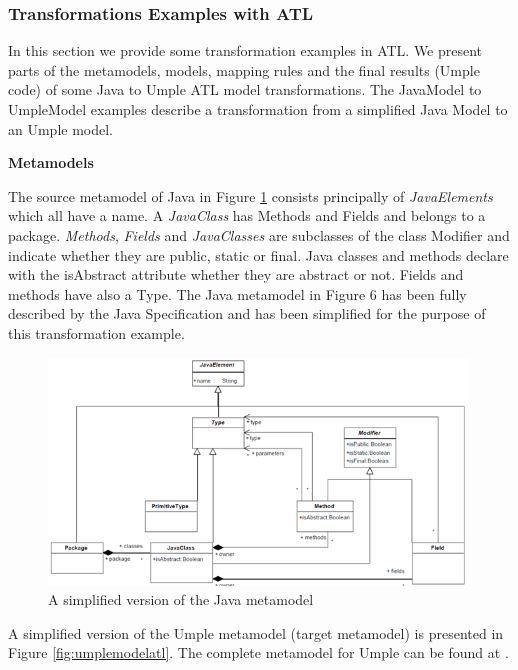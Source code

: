 \subsubsection{Transformations Examples with ATL}
\label{subsubsec:exampleATL}

In this section we provide some transformation examples in ATL. We present parts of the metamodels, models, mapping rules and the final results (Umple code) of some Java to Umple ATL model transformations.
The JavaModel to UmpleModel examples describe a transformation from a simplified Java Model to an Umple model. 

\textbf{Metamodels} 

The source metamodel of Java in Figure \ref{fig:javamodelatl} consists principally of \textit{JavaElements} which all have a name. A \textit{JavaClass} has Methods and Fields and belongs to a package. \textit{Methods}, \textit{Fields} and \textit{JavaClasses} are subclasses of the class Modifier and indicate whether they are public, static or final. Java classes and methods declare with the isAbstract attribute whether they are abstract or not. Fields and methods have also a Type. The Java metamodel in Figure 6 has been fully described by the Java Specification \cite{javaSpec} and has been simplified for the purpose of this transformation example.

\begin{figure}[h]
\centering
\includegraphics[width=0.99\textwidth]{Figures/javametamodel.png} 
\caption{A simplified version of the Java metamodel}
\label{fig:javamodelatl}
\end{figure}

A simplified version of the Umple metamodel (target metamodel) is presented in Figure \ref{fig:umplemodelatl}. The complete metamodel for Umple can be found at \cite{UmpleMetamodel}.

